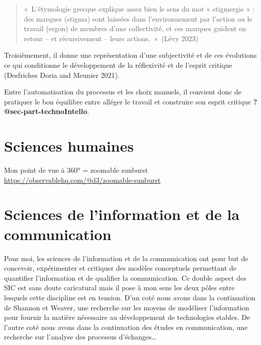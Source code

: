 \documentclass[
  letterpaper,
  DIV=11,
  numbers=noendperiod]{scrreprt}
\begin{document}
\begin{quote}
«~L'étymologie grecque explique assez bien le sens du mot « stigmergie »
: des marques (stigma) sont laissées dans l'environnement par l'action
ou le travail (ergon) de membres d'une collectivité, et ces marques
guident en retour -- et récursivement -- leurs actions.~»~(Lévy 2023)
\end{quote}

Troisièmement, il donne une représentation d'une subjectivité et de ces
évolutions ce qui conditionne le développement de la réflexivité et de
l'esprit critique (Desfriches Doria and Meunier 2021).

Entre l'automatisation du processus et les choix manuels, il convient
donc de pratiquer le bon équilibre entre alléger le travail et
construire son esprit critique \textbf{?@sec-part-technoIntello}.

\hypertarget{sec-posiSciencesHumaines}{%
\section{Sciences humaines}\label{sec-posiSciencesHumaines}}

Mon point de vue à 360° = zoomable sunburst
\url{https://observablehq.com/@d3/zoomable-sunburst}

\hypertarget{sec-posiSIC}{%
\section{Sciences de l'information et de la
communication}\label{sec-posiSIC}}

Pour moi, les sciences de l'information et de la communication ont pour
but de concevoir, expérimenter et critiquer des modèles conceptuels
permettant de quantifier l'information et de qualifier la communication.
Ce double aspect des SIC est sans doute caricatural mais il pose à mon
sens les deux pôles entre lesquels cette discipline est en tension. D'un
coté nous avons dans la continuation de Shannon et Weaver, une recherche
sur les moyens de modéliser l'information pour fournir la matière
nécessaire au développement de technologies stables. De l'autre coté
nous avons dans la continuation des études en communication, une
recherche sur l'analyse des processus d'échanges\ldots{}
\end{document}
